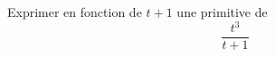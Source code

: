 Exprimer en fonction de $t+1$ une primitive de
\begin{displaymath}
 \frac{t^3}{t+1}
\end{displaymath}
\bigskip \bigskip \bigskip